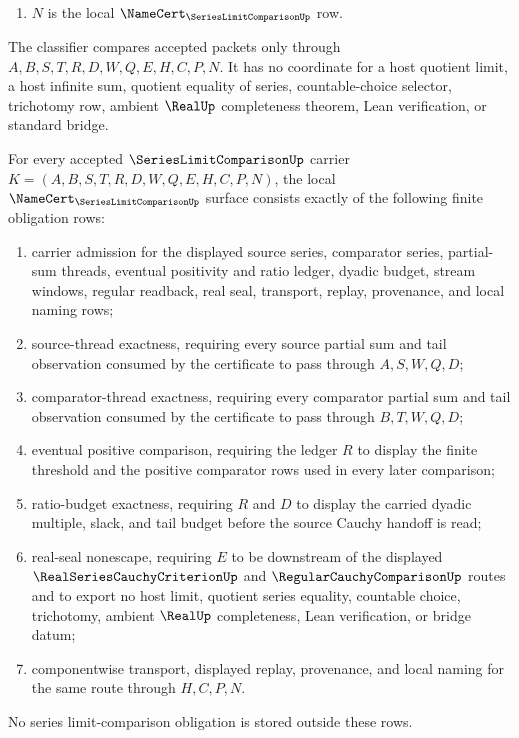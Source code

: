 \begin{definition}
\begin{enumerate}
\item $N$ is the local $\NameCert_{\SeriesLimitComparisonUp}$ row.
\end{enumerate}
The classifier compares accepted packets only through $A,B,S,T,R,D,W,Q,E,H,C,P,N$. It has no coordinate for a host quotient limit, a host infinite sum, quotient equality of series, countable-choice selector, trichotomy row, ambient $\RealUp$ completeness theorem, Lean verification, or standard bridge.
\end{definition}

\begin{theorem}\label{thm:series-limit-comparison-namecert-obligations}
For every accepted $\SeriesLimitComparisonUp$ carrier $K=(A,B,S,T,R,D,W,Q,E,H,C,P,N)$, the local $\NameCert_{\SeriesLimitComparisonUp}$ surface consists exactly of the following finite obligation rows:
\begin{enumerate}
\item carrier admission for the displayed source series, comparator series, partial-sum threads, eventual positivity and ratio ledger, dyadic budget, stream windows, regular readback, real seal, transport, replay, provenance, and local naming rows;
\item source-thread exactness, requiring every source partial sum and tail observation consumed by the certificate to pass through $A,S,W,Q,D$;
\item comparator-thread exactness, requiring every comparator partial sum and tail observation consumed by the certificate to pass through $B,T,W,Q,D$;
\item eventual positive comparison, requiring the ledger $R$ to display the finite threshold and the positive comparator rows used in every later comparison;
\item ratio-budget exactness, requiring $R$ and $D$ to display the carried dyadic multiple, slack, and tail budget before the source Cauchy handoff is read;
\item real-seal nonescape, requiring $E$ to be downstream of the displayed $\RealSeriesCauchyCriterionUp$ and $\RegularCauchyComparisonUp$ routes and to export no host limit, quotient series equality, countable choice, trichotomy, ambient $\RealUp$ completeness, Lean verification, or bridge datum;
\item componentwise transport, displayed replay, provenance, and local naming for the same route through $H,C,P,N$.
\end{enumerate}
No series limit-comparison obligation is stored outside these rows.
\end{theorem}
